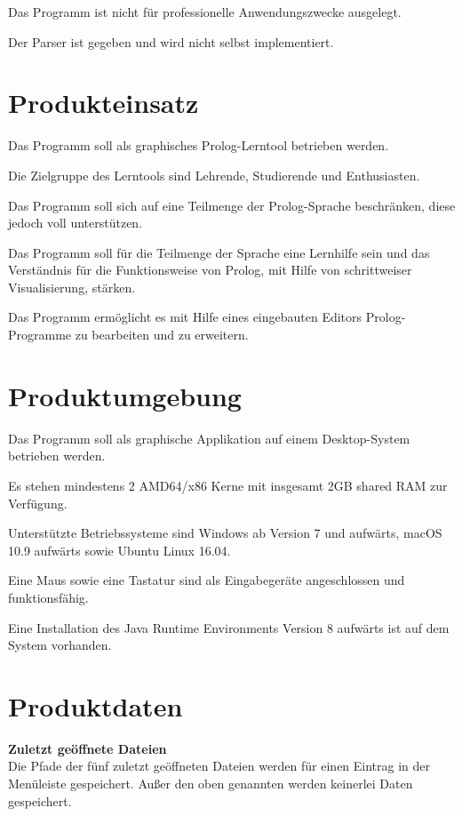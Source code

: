 \documentclass[parskip=full,11pt,twoside]{scrartcl}
\begin{document}
Das Programm ist nicht für professionelle Anwendungszwecke ausgelegt.


Der Parser ist gegeben und wird nicht selbst implementiert.

\pagebreak
\section{Produkteinsatz}

Das Programm soll als graphisches Prolog-Lerntool betrieben werden.

Die Zielgruppe des Lerntools sind Lehrende, Studierende und Enthusiasten.

Das Programm soll sich auf eine Teilmenge der Prolog-Sprache beschränken, diese jedoch voll unterstützen.

Das Programm soll für die Teilmenge der Sprache eine Lernhilfe sein und das Verständnis für die Funktionsweise von Prolog, mit Hilfe von schrittweiser Visualisierung, stärken.

Das Programm ermöglicht es mit Hilfe eines eingebauten Editors Prolog-Programme zu bearbeiten und zu erweitern.

\section{Produktumgebung}

Das Programm soll als graphische Applikation auf einem Desktop-System betrieben werden.

Es stehen mindestens 2 AMD64/x86 Kerne mit insgesamt 2GB shared RAM zur Verfügung.

Unterstützte Betriebssysteme sind Windows ab Version 7 und aufwärts, macOS 10.9 aufwärts sowie Ubuntu Linux 16.04.

Eine Maus sowie eine Tastatur sind als Eingabegeräte angeschlossen und funktionsfähig.

Eine Installation des Java Runtime Environments Version 8 aufwärts ist auf dem System vorhanden.

\section{Produktdaten}

\textbf{Zuletzt geöffnete Dateien} \\
Die Pfade der fünf zuletzt geöffneten Dateien werden für einen Eintrag in der Menüleiste gespeichert. Außer den oben genannten werden keinerlei Daten gespeichert.
\end{document}
